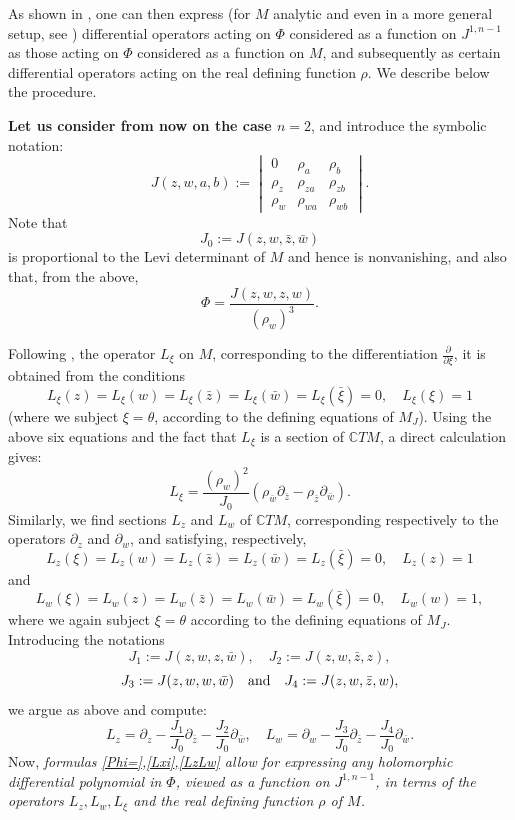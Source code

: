 \documentclass[12pt]{amsart}
\def\CC{\mathbb{C}}
\def\beq{\begin{equation}}
\def\eeq{\end{equation}}
\begin{document}
As shown in \cite{KZ2}, one can then express (for $M$ analytic and even in a more general setup, see \cite{KZ2}) differential operators acting on $\Phi$ considered as a function on $J^{1,n-1}$ as those acting on $\Phi$ considered as a function on $M$, and subsequently as certain differential operators acting on the real defining function $\rho$. We describe below the procedure. 

{\bf Let us consider from now on the case $n=2$}, and introduce the symbolic notation:
\begin{equation}\label{Jzwab}
	J(z,w,a,b):=
\begin{vmatrix} 0 & \rho_{a} & \rho_b\\ \rho_{z} & \rho_{za} & \rho_{zb} \\ \rho_w & \rho_{wa} & \rho_{wb} \end{vmatrix}.
\end{equation}
Note that
$$J_0:=J(z,w,\bar z,\bar w)$$
is proportional to the Levi determinant of $M$ and hence is nonvanishing, and also that, from the above, 
\beq\label{Phi=}\Phi=\frac{J(z,w,z,w)}{(\rho_w)^3}.\eeq

Following \cite{KZ2}, the operator $L_\xi$ on $M$, corresponding to the differentiation $\frac{\partial}{\partial\xi}$, it is obtained from the conditions
$$L_\xi(z)=L_\xi(w)=L_\xi(\bar z)=L_\xi(\bar w)=L_\xi(\bar\xi)=0,\quad L_\xi(\xi)=1$$
(where we subject $\xi=\theta$, according to the defining equations of $M_J$). Using the above six equations and the fact that $L_\xi$ is a section of $\CC{}TM$, a direct calculation gives: 
\beq\label{Lxi}
L_\xi=\frac{(\rho_w)^2}{J_0}(\rho_{\bar w}\partial_{\bar z}-\rho_{\bar z}\partial_{\bar w}).
\eeq
Similarly, we find sections $L_z$ and $ L_w$ of $\CC{}TM$, corresponding respectively to the operators $\partial_{z}$ and $\partial_w$, and satisfying, respectively,
$$L_z(\xi)=L_z(w)=L_z(\bar z)=L_z(\bar w)=L_z(\bar\xi)=0,\quad L_z(z)=1$$
and
$$L_w(\xi)=L_w(z)=L_w(\bar z)=L_w(\bar w)=L_w(\bar\xi)=0,\quad L_w(w)=1,$$
where we again subject $\xi=\theta$  according to the defining equations of $M_J$.
 Introducing the notations
$$J_1:=J(z,w,z,\bar w), \quad J_2:=J(z,w,\bar z,z), 
$$
$$
 J_3:=J(z,w,w,\bar w)\quad\hbox{and}\quad  J_4:=J(z,w,\bar z,w),$$
we argue as above and compute:
\beq\label{LzLw}
L_z=\partial_z-\frac{J_1}{J_0}\partial_{\bar z}-\frac{J_2}{J_0}\partial_{\bar w}, \quad 
L_w=\partial_w-\frac{J_3}{J_0}\partial_{\bar z}-\frac{J_4}{J_0}\partial_{\bar w}.
\eeq
Now, {\it formulas \eqref{Phi=},\eqref{Lxi},\eqref{LzLw} allow for expressing any holomorphic differential polynomial in $\Phi$, viewed  as a function on $J^{1,n-1}$, in terms of the operators $L_z,L_w,L_\xi$ and the real defining function $\rho$ of $M$.}
\end{document}
